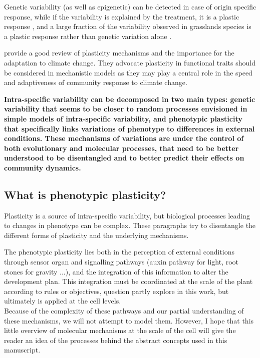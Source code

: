 {Genetic variability (as well as epigenetic) can be detected in case of origin specific response, while if the variability is explained by the treatment, it is a plastic response \parencite{frei_plastic_2014}, and a large fraction of the variability observed in grasslands species is a plastic response rather than genetic variation alone \parencite{frei_plastic_2014, merila_climate_2014}.

\cite{nicotra_plant_2010} provide a good review of plasticity mechanisms and the importance for the adaptation to climate change. They advocate plasticity in functional traits should be considered in mechanistic models as they may play a central role in the speed and adaptiveness of community response to climate change.


\textbf{Intra-specific variability can be decomposed in two main types: genetic variability that seems to be closer to random processes envisioned in simple models of intra-specific variability, and phenotypic plasticity that specifically links variations of phenotype to differences in external conditions. These mechanisms of variations are under the control of both evolutionary and molecular processes, that need to be better understood to be disentangled and to better predict their effects on community dynamics.}

\subsection{What is phenotypic plasticity?}

Plasticity is a source of intra-specific variability, but biological processes leading to changes in phenotype can be complex. These paragraphs try to disentangle the different forms of plasticity and the underlying mechanisms.

\begin{fullwidth}
\begin{tcolorbox}[title=Molecular basis of phenotypic plasticity] %
The phenotypic plasticity lies both in the perception of external conditions through sensor organ and signalling pathways (auxin pathway for light, root stones for gravity ...), and the integration of this information to alter the development plan. This integration must be coordinated at the scale of the plant according to rules or objectives, question partly explore in this work, but ultimately is applied at the cell levels.\\
\indent Because of the complexity of these pathways and our partial understanding of these mechanisms, we will not attempt to model them. However, I hope that this little overview of molecular mechanisms at the scale of the cell will give the reader an idea of the processes behind the abstract concepts used in this manuscript.\\


\end{tcolorbox}
\end{fullwidth}}

